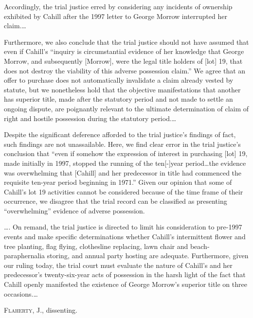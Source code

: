 Accordingly, the trial justice erred by considering any incidents of ownership
exhibited by Cahill after the 1997 letter to George Morrow interrupted her
claim.\ldots


Furthermore, we also conclude that the trial justice should not have assumed
that even if Cahill's ``inquiry is circumstantial evidence of her knowledge
that George Morrow, and subsequently [Morrow], were the legal title holders of
[lot] 19, that does not destroy the viability of this adverse possession
claim.'' We agree that an offer to purchase does not automatically invalidate a
claim already vested by statute, but we nonetheless hold that the objective
manifestations that another has superior title, made after the statutory period
and not made to settle an ongoing dispute, are poignantly relevant to the
ultimate determination of claim of right and hostile possession during the
statutory period.\ldots


Despite the significant deference afforded to the trial justice's findings of
fact, such findings are not unassailable. Here, we find clear error in the
trial justice's conclusion that ``even if somehow the expression of interest in
purchasing [lot] 19, made initially in 1997, stopped the running of the
ten[-]year period\ldots the evidence was overwhelming that [Cahill] and her
predecessor in title had commenced the requisite ten-year period beginning in
1971.'' Given our opinion that some of Cahill's lot 19 activities cannot be
considered because of the time frame of their occurrence, we disagree that the
trial record can be classified as presenting ``overwhelming'' evidence of
adverse possession.

\ldots. On remand, the trial justice is directed to limit his consideration to
pre-1997 events and make specific determinations whether Cahill's intermittent
flower and tree planting, flag flying, clothesline replacing, lawn chair and
beach-paraphernalia storing, and annual party hosting are adequate.
Furthermore, given our ruling today, the trial court must evaluate the nature
of Cahill's and her predecessor's twenty-six-year acts of possession in the
harsh light of the fact that Cahill openly manifested the existence of George
Morrow's superior title on three occasions.\ldots

\opinion \textsc{Flaherty}, J., dissenting. 

